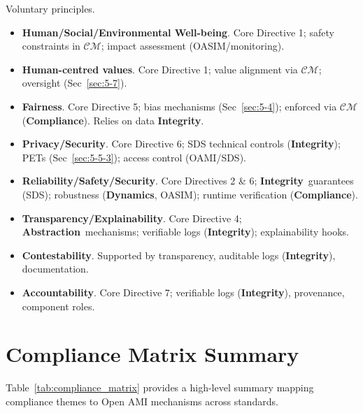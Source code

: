 \documentclass[12pt,a4paper]{report}
\newcommand{\Integrity}{\textbf{Integrity}}
\newcommand{\Abstraction}{\textbf{Abstraction}}
\newcommand{\Dynamics}{\textbf{Dynamics}}
\begin{document}
	Voluntary principles.
	
	\begin{itemize}
		\item \textbf{Human/Social/Environmental Well-being}. Core Directive 1; safety constraints in $\mathcal{CM}$; impact assessment (OASIM/monitoring).
		\item \textbf{Human-centred values}. Core Directive 1; value alignment via $\mathcal{CM}$; oversight (Sec~\ref{sec:5-7}).
		\item \textbf{Fairness}. Core Directive 5; bias mechanisms (Sec~\ref{sec:5-4}); enforced via $\mathcal{CM}$ (\textbf{Compliance}). Relies on data \Integrity.
		\item \textbf{Privacy/Security}. Core Directive 6; SDS technical controls (\Integrity); PETs (Sec~\ref{sec:5-5-3}); access control (OAMI/SDS).
		\item \textbf{Reliability/Safety/Security}. Core Directives 2 \& 6; \Integrity\ guarantees (SDS); robustness (\Dynamics, OASIM); runtime verification (\textbf{Compliance}).
		\item \textbf{Transparency/Explainability}. Core Directive 4; \Abstraction\ mechanisms; verifiable logs (\Integrity); explainability hooks.
		\item \textbf{Contestability}. Supported by transparency, auditable logs (\Integrity), documentation.
		\item \textbf{Accountability}. Core Directive 7; verifiable logs (\Integrity), provenance, component roles.
	\end{itemize}
	
	\section{Compliance Matrix Summary}
	\label{app:compmap_matrix_summary}
	
	Table~\ref{tab:compliance_matrix} provides a high-level summary mapping compliance themes to Open AMI mechanisms across standards.
	
\end{document}
